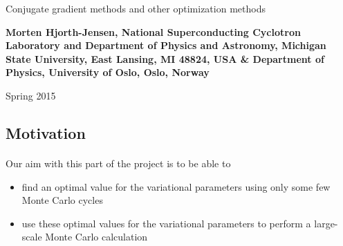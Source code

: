 \documentclass[%
twoside,                 %
final,                   %
10pt]{article}
\begin{document}






\thispagestyle{empty}

\begin{center}
{\LARGE\bf
\begin{spacing}{1.25}
Conjugate gradient methods and other optimization methods
\end{spacing}
}
\end{center}


\begin{center}
{\bf Morten Hjorth-Jensen, National Superconducting Cyclotron Laboratory and Department of Physics and Astronomy, Michigan State University, East Lansing, MI 48824, USA {\&} Department of Physics, University of Oslo, Oslo, Norway${}^{}$} \\ [0mm]
\end{center}

    \begin{center}
\end{center}
    

\begin{center} %
Spring 2015
\end{center}

\vspace{1cm}


\subsection*{Motivation}

\paragraph{}
Our aim with this part of the project is to be able to
\begin{itemize}
\item find an optimal value for the variational parameters using only some few Monte Carlo cycles

\item use these optimal values for the variational parameters to perform a large-scale Monte Carlo calculation
\end{itemize}
\end{document}
